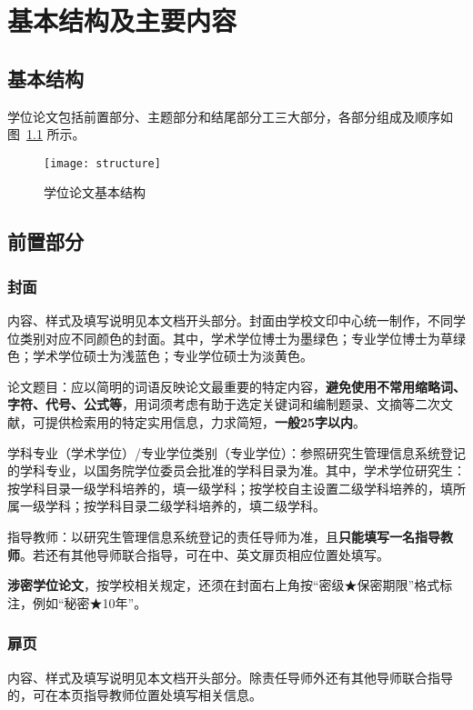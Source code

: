 
\chapter{基本结构及主要内容}

\section{基本结构}
学位论文包括前置部分、主题部分和结尾部分工三大部分，各部分组成及顺序如图~\ref{fig:sturcture} 所示。

\begin{figure}
\centering
\texttt{[image: structure]}
\caption{学位论文基本结构}
\label{fig:sturcture}
\end{figure}
\section{前置部分}

\subsection{封面}
内容、样式及填写说明见本文档开头部分。封面由学校文印中心统一制作，不同学位类别对应不同颜色的封面。其中，学术学位博士为墨绿色；专业学位博士为草绿色；学术学位硕士为浅蓝色；专业学位硕士为淡黄色。

论文题目：应以简明的词语反映论文最重要的特定内容，\textbf{避免使用不常用缩略词、字符、代号、公式等}，用词须考虑有助于选定关键词和编制题录、文摘等二次文献，可提供检索用的特定实用信息，力求简短，\textbf{一般25字以内}。

学科专业（学术学位）/专业学位类别（专业学位）：参照研究生管理信息系统登记的学科专业，以国务院学位委员会批准的学科目录为准。其中，学术学位研究生：按学科目录一级学科培养的，填一级学科；按学校自主设置二级学科培养的，填所属一级学科；按学科目录二级学科培养的，填二级学科。

指导教师：以研究生管理信息系统登记的责任导师为准，且\textbf{只能填写一名指导教师}。若还有其他导师联合指导，可在中、英文扉页相应位置处填写。

\textbf{涉密学位论文}，按学校相关规定，还须在封面右上角按“密级★保密期限”格式标注，例如“秘密★10年”。

\subsection{扉页}
内容、样式及填写说明见本文档开头部分。除责任导师外还有其他导师联合指导的，可在本页指导教师位置处填写相关信息。

